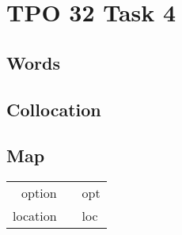 \section{TPO 32 Task 4}

\subsection{Words}

\subsection{Collocation}

\subsection{Map}

\begin{tabular}{rc@{\quad$\to$\quad}l}
    option   &  & opt \\
    location &  & loc \\
\end{tabular}

\newpage
